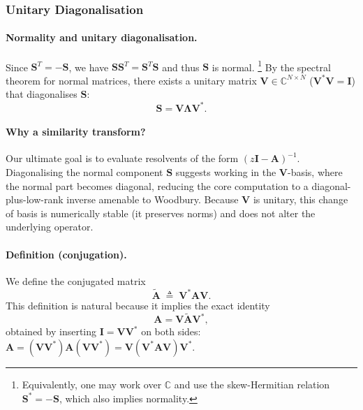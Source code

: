 \documentclass[a4paper,11pt]{article}
\begin{document}
\subsubsection{Unitary Diagonalisation}

\paragraph{Normality and unitary diagonalisation.}
Since $\mathbf{S}^T=-\mathbf{S}$, we have $\mathbf{S}\mathbf{S}^T=\mathbf{S}^T\mathbf{S}$ and thus $\mathbf{S}$ is normal.%
\footnote{Equivalently, one may work over $\mathbb{C}$ and use the skew-Hermitian relation $\mathbf{S}^*=-\mathbf{S}$, which also implies normality.}
By the spectral theorem for normal matrices, there exists a unitary matrix $\mathbf{V}\in\mathbb{C}^{N\times N}$ ($\mathbf{V}^*\mathbf{V}=\mathbf{I}$) that diagonalises $\mathbf{S}$:
\begin{equation}\label{eq:S_diag}
    \mathbf{S} = \mathbf{V}\mathbf{\Lambda}\mathbf{V}^*.
\end{equation}

\paragraph{Why a similarity transform?}
Our ultimate goal is to evaluate resolvents of the form $(z\mathbf{I}-\mathbf{A})^{-1}$. Diagonalising the normal component $\mathbf{S}$ suggests working in the $\mathbf{V}$-basis, where the normal part becomes diagonal, reducing the core computation to a diagonal-plus-low-rank inverse amenable to Woodbury. Because $\mathbf{V}$ is unitary, this change of basis is numerically stable (it preserves norms) and does not alter the underlying operator.

\paragraph{Definition (conjugation).}
We define the conjugated matrix
\begin{equation}\label{eq:A_tilde_def}
\tilde{\mathbf{A}} \;\triangleq\; \mathbf{V}^*\mathbf{A}\mathbf{V}.
\end{equation}
This definition is natural because it implies the exact identity
\begin{equation}\label{eq:A_factorisation}
\mathbf{A} = \mathbf{V}\tilde{\mathbf{A}}\mathbf{V}^*,
\end{equation}
obtained by inserting $\mathbf{I}=\mathbf{V}\mathbf{V}^*$ on both sides:
$\mathbf{A}=(\mathbf{V}\mathbf{V}^*)\mathbf{A}(\mathbf{V}\mathbf{V}^*)=\mathbf{V}(\mathbf{V}^*\mathbf{A}\mathbf{V})\mathbf{V}^*$.
\end{document}

